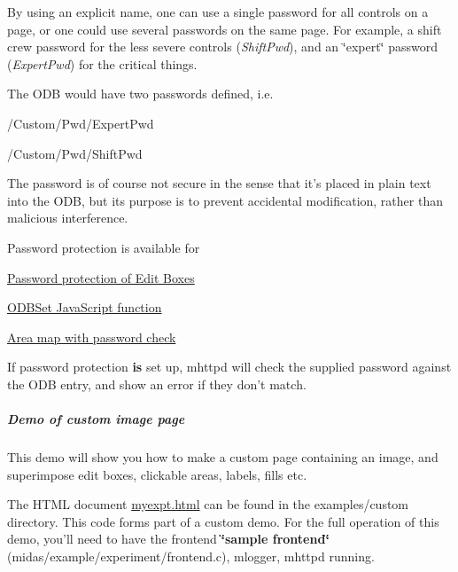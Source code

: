By using an explicit name, one can use a single password for all controls on a page, or one could use several passwords on the same page. For example, a shift crew password for the less severe controls ({\itshape ShiftPwd\/}), and an \char`\"{}expert\char`\"{} password ({\itshape ExpertPwd\/}) for the critical things.

The ODB would have two passwords defined, i.e.\par
  /Custom/Pwd/ExpertPwd\par
 /Custom/Pwd/ShiftPwd\par


The password is of course not secure in the sense that it's placed in plain text into the ODB, but its purpose is to prevent accidental modification, rather than malicious interference.

\par
 Password protection is available for
\begin{DoxyItemize}
\item \hyperlink{RC_mhttpd_Image_access_RC_mhttpd_custom_pw}{Password protection of Edit Boxes}
\item \hyperlink{RC_mhttpd_custom_ODB_access_RC_mhttpd_custom_odbset}{ODBSet JavaScript function}
\item \hyperlink{RC_mhttpd_Image_access_RC_mhttpd_custom_imagemap_pw}{Area map with password check}
\end{DoxyItemize}

If password protection {\bfseries is} set up, mhttpd will check the supplied password against the ODB entry, and show an error if they don't match.

\label{index_end}
\hypertarget{index_end}{}


 \subparagraph{Demo of custom image page}\label{RC_mhttpd_custom_demo}
\par




\par


This demo will show you how to make a custom page containing an image, and superimpose edit boxes, clickable areas, labels, fills etc.

The HTML document \hyperlink{myexpt_8html}{myexpt.html} can be found in the examples/custom directory. This code forms part of a custom demo. For the full operation of this demo, you'll need to have the frontend {\bfseries \char`\"{}sample frontend\char`\"{}} (midas/example/experiment/frontend.c), mlogger, mhttpd running.

